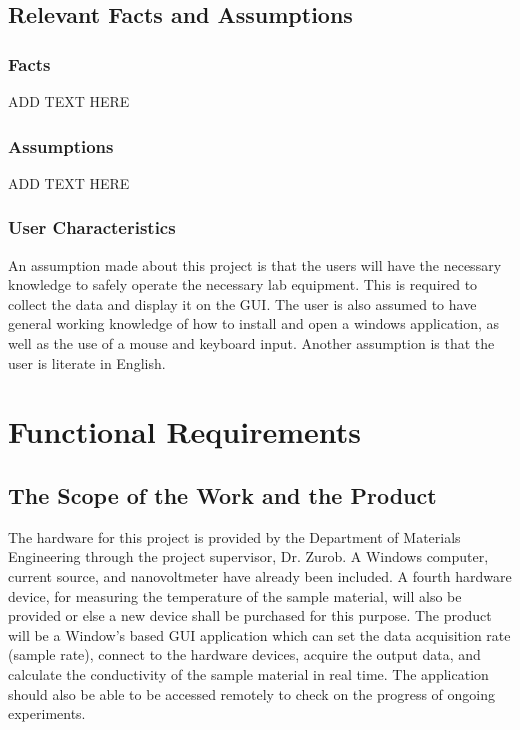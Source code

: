 \documentclass[12pt, titlepage]{article}
\begin{document}
\subsection{Relevant Facts and Assumptions}
\subsubsection{Facts}
ADD TEXT HERE

\subsubsection{Assumptions}
ADD TEXT HERE

\subsubsection{User Characteristics}
An assumption made about this project is that the users will have the necessary knowledge to safely operate the necessary lab equipment. This is required to collect the data and display it on the GUI. 
The user is also assumed to have general working knowledge of how to install and open a windows application, as well as the use of a mouse and keyboard input. Another assumption is that the user is literate in English.

\section{Functional Requirements}
\subsection{The Scope of the Work and the Product}

The hardware for this project is provided by the Department of Materials Engineering through the project supervisor, Dr. Zurob. A Windows computer, current source, and nanovoltmeter have already been included. A fourth hardware device, for measuring the temperature of the sample material, will also be provided or else a new device shall be purchased for this purpose. The product will be a Window's based GUI application which can set the data acquisition rate (sample rate), connect to the hardware devices, acquire the output data, and calculate the conductivity of the sample material in real time. The application should also be able to be accessed remotely to check on the progress of ongoing experiments. \\
\end{document}
